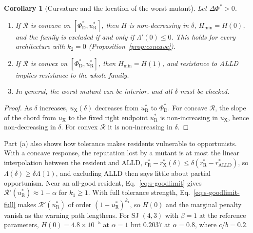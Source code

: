 \documentclass[10pt]{wlscirep}
\newcommand{\Rmap}{\mathscr{R}}            %
\newcommand{\rR}{r_{\mathrm{R}}^{*}}
\newcommand{\uR}{u_{\mathrm{R}}^{*}}
\newcommand{\rX}{r_{\mathrm{X}}^{*}}
\newcommand{\uX}{u_{\mathrm{X}}}
\newcommand{\PhiDs}{\Phi^{*}_{\mathrm{D}}}
\newcommand{\dPhi}{\Delta\Phi^{*}}
\newcommand{\Hmin}{H_{\min}}
\newcommand{\ALLD}{\mathrm{ALLD}}
\theoremstyle{plain}
\newtheorem{corollary}[lemma]{Corollary}
\theoremstyle{remark}
\begin{document}
\begin{corollary}[Curvature and the location of the worst mutant]\label{cor:curvature}
Let $\dPhi>0$.
\begin{enumerate}
\item[(a)] If $\Rmap$ is concave on $[\PhiDs,\uR]$, then $H$ is non-decreasing in $\delta$, $\Hmin=H(0)$, and the family is excluded if and only if $\Lambda'(0)\leq0$. This holds for every architecture with $k_2=0$ (Proposition~\ref{prop:concave}).
\item[(b)] If $\Rmap$ is convex on $[\PhiDs,\uR]$, then $\Hmin=H(1)$, and resistance to ALLD implies resistance to the whole family.
\item[(c)] In general, the worst mutant can be interior, and all $\delta$ must be checked.
\end{enumerate}
\end{corollary}
\begin{proof}
As $\delta$ increases, $\uX(\delta)$ decreases from $\uR$ to $\PhiDs$. For concave $\Rmap$, the slope of the chord from $\uX$ to the fixed right endpoint $\uR$ is non-increasing in $\uX$, hence non-decreasing in $\delta$. For convex $\Rmap$ it is non-increasing in $\delta$.
\end{proof}

Part (a) also shows how tolerance makes residents vulnerable to opportunists. With a concave response, the reputation lost by a mutant is at most the linear interpolation between the resident and ALLD, $\rR-\rX(\delta)\leq\delta(\rR-r^*_{\ALLD})$, so $\Lambda(\delta)\geq\delta\Lambda(1)$, and excluding ALLD then says little about partial opportunism. Near an all-good resident, Eq.~\eqref{eq:s-goodlimit} gives $\Rmap'(\uR)\approx1-\alpha$ for $k_1\geq1$. With full tolerance strength, Eq.~\eqref{eq:s-goodlimit-full} makes $\Rmap'(\uR)$ of order $(1-\uR)^{k_1}$, so $H(0)$ and the marginal penalty vanish as the warning path lengthens. For SJ $(4,3)$ with $\beta=1$ at the reference parameters, $H(0)=4.8\times10^{-5}$ at $\alpha=1$ but $0.2037$ at $\alpha=0.8$, where $c/b=0.2$.
\end{document}
